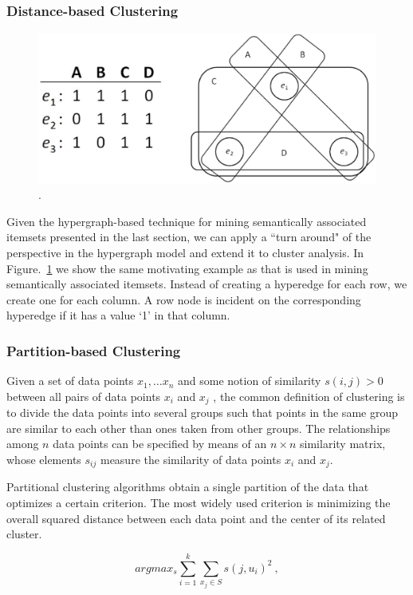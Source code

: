 \subsubsection{Distance-based Clustering}

\begin{figure}[tbh]
\centering
\includegraphics[width=.6\textwidth]{fig/hypergraph-column-wise.eps}
\caption{\label{fig:hypergraph-column-wise} .}
\end{figure}
Given the hypergraph-based technique for mining semantically associated itemsets presented in the last section, we can apply a ``turn around" of the perspective in the hypergraph model and extend it to cluster analysis. In Figure.~\ref{fig:hypergraph-column-wise} we show the same motivating example as that is used in mining semantically associated itemsets. Instead of creating a hyperedge for each row, we create one for each column. A row node is incident on the corresponding hyperedge if it has a value `1' in that column.

\subsubsection{Partition-based Clustering}
Given a set of data points $x_1, \ldots x_n$ and some notion of similarity $s(i,j) > 0$ between all pairs of data points $x_i$ and $x_j$ , the common definition of clustering is to divide the data points into several groups such that points in the same group are similar to each other than ones taken from other groups. The relationships among $n$ data points can be specified by means of an $n \times n$ similarity matrix, whose elements $s_{ij}$ measure the similarity of data points $x_i$ and $x_j$.

Partitional clustering algorithms obtain a single partition of the data that optimizes a certain criterion. The most widely used criterion is minimizing the overall squared distance between each data point and the center of its related cluster.

\begin{equation}
argmax_s\sum^k_{i=1}\sum_{x_j\in S}s(j,u_i)^2~, \label{eq:kmeans}
\end{equation}

